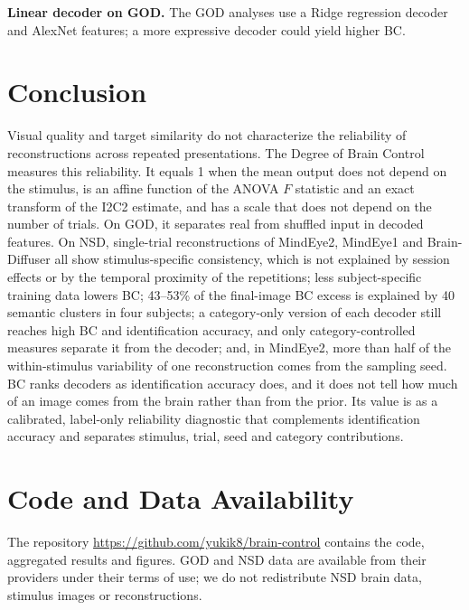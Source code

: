 \documentclass[11pt,a4paper]{article}
\begin{document}
\textbf{Linear decoder on GOD.} The GOD analyses use a Ridge regression decoder
and AlexNet features; a more expressive decoder could yield higher BC.

\section{Conclusion}

Visual quality and target similarity do not characterize the reliability of
reconstructions across repeated presentations. The Degree of Brain Control
measures this reliability. It equals 1 when the mean output does not depend on the stimulus, is an affine function of
the ANOVA $F$ statistic and an exact transform of the I2C2 estimate, and has a
scale that does not depend on the number of trials. On GOD, it separates real
from shuffled input in decoded features. On NSD, single-trial reconstructions
of MindEye2, MindEye1 and Brain-Diffuser all show stimulus-specific
consistency, which is not explained by session effects or by the temporal
proximity of the repetitions; less subject-specific training data lowers BC;
43--53\% of the final-image BC excess is explained by 40 semantic clusters in
four subjects; a category-only version of each decoder still reaches high BC
and identification accuracy, and only category-controlled measures separate it
from the decoder; and, in MindEye2, more than half of the within-stimulus variability of one reconstruction comes
from the sampling seed. BC ranks decoders as identification accuracy does, and
it does not tell how much of an image comes from the brain rather than from the
prior. Its value is as a calibrated, label-only reliability diagnostic that
complements identification accuracy and separates stimulus, trial, seed and
category contributions.

\section*{Code and Data Availability}

The repository \url{https://github.com/yukik8/brain-control} contains the code,
aggregated results and figures. GOD and NSD data are available from their
providers under their terms of use; we do not redistribute NSD brain data,
stimulus images or reconstructions.



\end{document}
